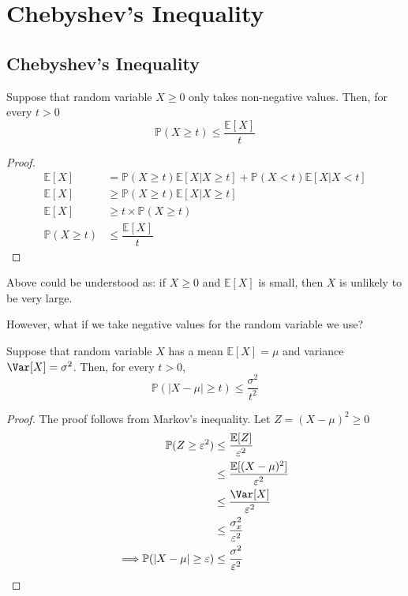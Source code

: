 \chapter{Chebyshev's Inequality}

\section{Chebyshev's Inequality}
\begin{theorem}
    Suppose that random variable \(X \geq 0\) only takes non-negative values. Then, for every \(t > 0\) 
    \[
        \mathbb{P}(X \geq t) \leq \dfrac{\mathbb{E}[X]}{t}
    \]
    \begin{proof}
        \[
            \begin{aligned}
                \mathbb{E}[X] &= \mathbb{P}(X \geq t)\mathbb{E}[X \vert X \geq t] + \mathbb{P}(X < t)\mathbb{E}[X \vert X < t] \\
                \mathbb{E}[X] &\geq \mathbb{P}(X \geq t)\mathbb{E}[X \vert X \geq t] \\
                \mathbb{E}[X] &\geq t \times \mathbb{P}(X \geq t) \\
                \mathbb{P}(X \geq t) &\leq \dfrac{\mathbb{E}[X]}{t}
            \end{aligned}
        \]
    \end{proof}
\end{theorem}

Above could be understood as: if \(X \geq 0\) and \(\mathbb{E}[X]\) is small, then \(X\) is unlikely to be very large.

However, what if we take negative values for the random variable we use? 
\begin{theorem}
    Suppose that random variable \(X\) has a mean \(\mathbb{E}[X] = \mu\) and variance \(\Var[X] = \sigma^2\). Then, for every \(t > 0\), 
    \[
        \mathbb{P}(\vert X - \mu \vert \geq t) \leq \dfrac{\sigma^2}{t^2}
    \]
    \begin{proof}
        The proof follows from Markov's inequality. Let \(Z = (X - \mu)^2 \geq 0\) 
        \[
            \begin{aligned}
                \mathbb{P}(Z \geq \varepsilon^2) &\leq \dfrac{\mathbb{E}[Z]}{\varepsilon^2} \\
                &\leq \dfrac{\mathbb{E}[(X - \mu)^2]}{\varepsilon^2} \\
                &\leq \dfrac{\Var[X]}{\varepsilon^2} \\
                &\leq \dfrac{\sigma_x^2}{\varepsilon^2} \\
                \Longrightarrow \mathbb{P}(\vert X - \mu \vert \geq \varepsilon) &\leq \dfrac{\sigma^2}{\varepsilon^2}
            \end{aligned}
        \]
    \end{proof}
\end{theorem}

